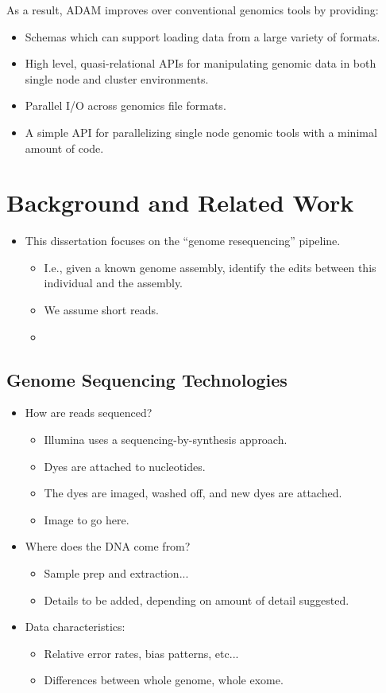 \documentclass[phd]{ucbthesis}
\begin{document}
As a result, \textsc{ADAM} improves over conventional genomics tools by providing:

\begin{itemize}
\item Schemas which can support loading data from a large variety of formats.
\item High level, quasi-relational APIs for manipulating genomic data in both
  single node and cluster environments.
\item Parallel I/O across genomics file formats.
\item A simple API for parallelizing single node genomic tools with a minimal
  amount of code.
\end{itemize}

\chapter{Background and Related Work}
\label{chap:background}

\begin{itemize}
\item This dissertation focuses on the ``genome resequencing'' pipeline.
  \begin{itemize}
  \item I.e., given a known genome assembly, identify the edits between this
    individual and the assembly.
  \item We assume short reads.
  \item 
  \end{itemize}
\end{itemize}

\section{Genome Sequencing Technologies}
\label{sec:genome-sequencing}

\begin{itemize}
\item How are reads sequenced?
  \begin{itemize}
  \item Illumina uses a sequencing-by-synthesis approach.
  \item Dyes are attached to nucleotides.
  \item The dyes are imaged, washed off, and new dyes are attached.
  \item Image to go here.
  \end{itemize}
\item Where does the DNA come from?
  \begin{itemize}
  \item Sample prep and extraction...
  \item Details to be added, depending on amount of detail suggested.
  \end{itemize}
\item Data characteristics:
  \begin{itemize}
  \item Relative error rates, bias patterns, etc...
  \item Differences between whole genome, whole exome.
  \end{itemize}
\end{itemize}
\end{document}
